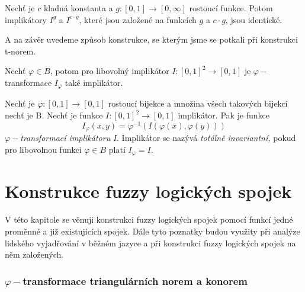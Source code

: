 \begin{sentence} \cite{habilitace}
    Nech\v t je $c$ kladn\'a konstanta a $g:[0,1] \to [0,\infty]$
    rostoucí  funkce. Potom implik\'atory $I^g$ a $I^{c \cdot g}$,
    které jsou zalo\v zen\'e na  funkcích $g$ a $c \cdot g$, jsou
    identick\'e.
\end{sentence}
A na z\'av\v er uvedeme zp\r usob konstrukce, se kter\'ym jsme se potkali p\v ri konstrukci t-norem.

\begin{sentence}\cite{Springer}
    Nech\v t $\varphi \in B$, potom pro libovolný implikátor $I: [0,1]^2 \rightarrow [0,1]$ je $\varphi-$transformace $I_\varphi$ také implikátor.
\end{sentence}

\begin{definition}\cite{Springer}
    Nech\v t je $\varphi:[0,1] \rightarrow [0,1]$  rostoucí
    bijekce a množina všech takových bijekcí nech\v t je B. Nech\v t je funkce
    $I:[0,1]^2\rightarrow [0,1]$ 
    implikátor.
    Pak je funkce
    $$I_\varphi(x,y)=\varphi^{-1}(I(\varphi (x), \varphi (y)))$$
    $\varphi-${\em transformací implikátoru} $I.$ Implikátor se nazývá
    {\em totálně invariantní,} pokud pro libovolnou funkci $\varphi \in B$ platí $I_\varphi=I.$\\
\end{definition}

\chapter{Konstrukce fuzzy logick\'ych spojek}
\label{kap3}

V této kapitole se věnuji konstrukci fuzzy logických spojek pomocí funkcí jedné proměnné a již existujících spojek. Dále tyto poznatky budou využity při analýze lidského vyjadřování v běžném jazyce a při konstrukci fuzzy logických spojek na něm založených.

\subsection{$\varphi-$transformace triangulárních norem a konorem}

